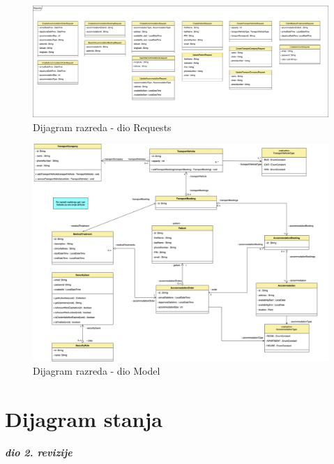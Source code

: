 			\begin{figure}[H]
				\includegraphics[scale=0.08]{slike/arhitektura_requests_class_diagram_v2.png} %
				\centering
				\caption{Dijagram razreda - dio Requests}
				\label{fig:arhitektura_requests_class_diagram}
			\end{figure}
			
			\begin{figure}[H]
				\includegraphics[scale=0.08]{slike/arhitektura_model_class_diagram_v2.png} %
				\centering
				\caption{Dijagram razreda - dio Model}
				\label{fig:arhitektura_model_class_diagram}
			\end{figure}
			
			
			
			\eject
		
		\section{Dijagram stanja}
			
			
			\textbf{\textit{dio 2. revizije}}\\
			
